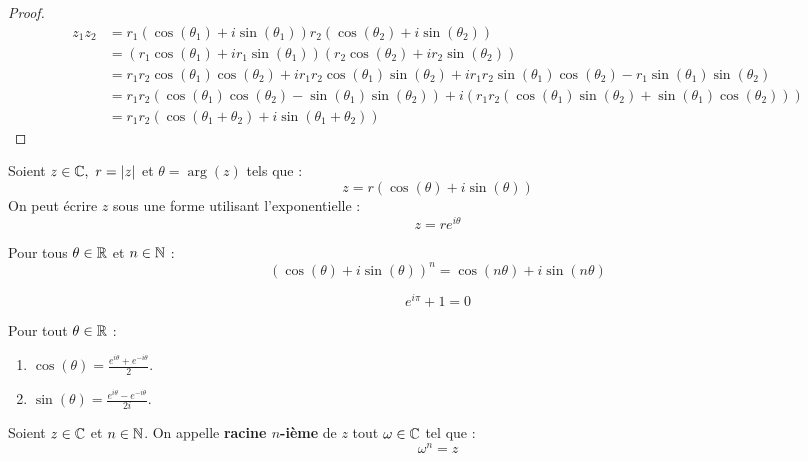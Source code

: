 \begin{proof}
	\begin{align*}
		z_1 z_2 &= r_1(\cos(\theta_1) + i \sin(\theta_1)) r_2(\cos(\theta_2) + i \sin(\theta_2)) \\
		&= (r_1 \cos(\theta_1) + i r_1 \sin(\theta_1))(r_2 \cos(\theta_2) + i r_2 \sin(\theta_2)) \\
		&= r_1 r_2 \cos(\theta_1) \cos(\theta_2) + i r_1 r_2 \cos(\theta_1) \sin(\theta_2) + i r_1 r_2 \sin(\theta_1) \cos(\theta_2) - r_1 \sin(\theta_1) \sin(\theta_2) \\
		&= r_1 r_2 (\cos(\theta_1) \cos(\theta_2) - \sin(\theta_1) \sin(\theta_2)) + i (r_1 r_2(\cos(\theta_1) \sin(\theta_2) + \sin(\theta_1)\cos(\theta_2))) \\
		&= r_1 r_2 (\cos(\theta_1 + \theta_2) + i \sin(\theta_1 + \theta_2))
	\end{align*}
\end{proof}

\begin{definition}
	Soient $z \in \mathbb{C},\ r = \abs{z}$ et $\theta = \arg(z)$ tels que :
	\[ z = r (\cos(\theta) + i \sin(\theta)) \]
	On peut écrire $z$ sous une forme utilisant l'exponentielle :
	\[ z = re^{i \theta} \]
\end{definition}

\begin{proposition}
	Pour tous $\theta \in \mathbb{R}$ et $n \in \mathbb{N}$ :
	\[ (\cos(\theta) + i \sin(\theta))^n = \cos(n \theta) + i \sin(n \theta) \]
\end{proposition}

\begin{proposition}
	\[ e^{i\pi} + 1 = 0 \]
\end{proposition}

\begin{proposition}
	Pour tout $\theta \in \mathbb{R}$ :
	\begin{enumerate}
			\item $\cos(\theta) = \frac{e^{i\theta} + e^{-i\theta}}{2}$.
			\item $\sin(\theta) = \frac{e^{i\theta} - e^{-i\theta}}{2i}$.
		\end{enumerate}
\end{proposition}

\begin{definition}
	Soient $z \in \mathbb{C}$ et $n \in \mathbb{N}$. On appelle \textbf{racine $n$-ième} de $z$ tout $\omega \in \mathbb{C}$ tel que :
	\[ \omega^n = z \] 
\end{definition}

